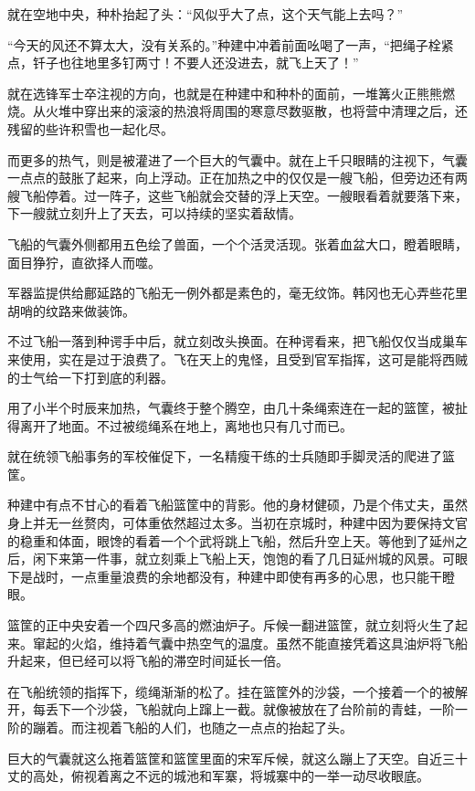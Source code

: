 就在空地中央，种朴抬起了头：“风似乎大了点，这个天气能上去吗？”

“今天的风还不算太大，没有关系的。”种建中冲着前面吆喝了一声，“把绳子栓紧点，钎子也往地里多钉两寸！不要人还没进去，就飞上天了！”

就在选锋军士卒注视的方向，也就是在种建中和种朴的面前，一堆篝火正熊熊燃烧。从火堆中穿出来的滚滚的热浪将周围的寒意尽数驱散，也将营中清理之后，还残留的些许积雪也一起化尽。

而更多的热气，则是被灌进了一个巨大的气囊中。就在上千只眼睛的注视下，气囊一点点的鼓胀了起来，向上浮动。正在加热之中的仅仅是一艘飞船，但旁边还有两艘飞船停着。过一阵子，这些飞船就会交替的浮上天空。一艘眼看着就要落下来，下一艘就立刻升上了天去，可以持续的坚实着敌情。

飞船的气囊外侧都用五色绘了兽面，一个个活灵活现。张着血盆大口，瞪着眼睛，面目狰狞，直欲择人而噬。

军器监提供给鄜延路的飞船无一例外都是素色的，毫无纹饰。韩冈也无心弄些花里胡哨的纹路来做装饰。

不过飞船一落到种谔手中后，就立刻改头换面。在种谔看来，把飞船仅仅当成巢车来使用，实在是过于浪费了。飞在天上的鬼怪，且受到官军指挥，这可是能将西贼的士气给一下打到底的利器。

用了小半个时辰来加热，气囊终于整个腾空，由几十条绳索连在一起的篮筐，被扯得离开了地面。不过被缆绳系在地上，离地也只有几寸而已。

就在统领飞船事务的军校催促下，一名精瘦干练的士兵随即手脚灵活的爬进了篮筐。

种建中有点不甘心的看着飞船篮筐中的背影。他的身材健硕，乃是个伟丈夫，虽然身上并无一丝赘肉，可体重依然超过太多。当初在京城时，种建中因为要保持文官的稳重和体面，眼馋的看着一个个武将跳上飞船，然后升空上天。等他到了延州之后，闲下来第一件事，就立刻乘上飞船上天，饱饱的看了几日延州城的风景。可眼下是战时，一点重量浪费的余地都没有，种建中即使有再多的心思，也只能干瞪眼。

篮筐的正中央安着一个四尺多高的燃油炉子。斥候一翻进篮筐，就立刻将火生了起来。窜起的火焰，维持着气囊中热空气的温度。虽然不能直接凭着这具油炉将飞船升起来，但已经可以将飞船的滞空时间延长一倍。

在飞船统领的指挥下，缆绳渐渐的松了。挂在篮筐外的沙袋，一个接着一个的被解开，每丢下一个沙袋，飞船就向上蹿上一截。就像被放在了台阶前的青蛙，一阶一阶的蹦着。而注视着飞船的人们，也随之一点点的抬起了头。

巨大的气囊就这么拖着篮筐和篮筐里面的宋军斥候，就这么蹦上了天空。自近三十丈的高处，俯视着离之不远的城池和军寨，将城寨中的一举一动尽收眼底。

